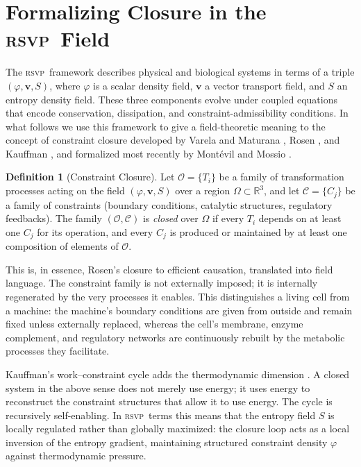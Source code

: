 \documentclass[11pt, a4paper]{article}
\theoremstyle{plain}
\theoremstyle{definition}
\newtheorem{definition}[theorem]{Definition}
\theoremstyle{remark}
\newcommand{\vv}{\mathbf{v}}
\newcommand{\Ent}{S}
\newcommand{\RSVP}{\textsc{rsvp}}
\begin{document}
\section{Formalizing Closure in the \RSVP\ Field}

The \RSVP\ framework describes physical and biological systems in terms of a triple $(\varphi, \vv, \Ent)$, where $\varphi$ is a scalar density field, $\vv$ a vector transport field, and $\Ent$ an entropy density field. These three components evolve under coupled equations that encode conservation, dissipation, and constraint-admissibility conditions. In what follows we use this framework to give a field-theoretic meaning to the concept of constraint closure developed by Varela and Maturana \cite{maturana1980, varela1979}, Rosen \cite{rosen1991}, and Kauffman \cite{kauffman2000}, and formalized most recently by Montévil and Mossio \cite{montevil2015}.

\begin{definition}[Constraint Closure]
Let $\mathcal{O} = \{T_i\}$ be a family of transformation processes acting on the field $(\varphi, \vv, \Ent)$ over a region $\Omega \subset \mathbb{R}^3$, and let $\mathcal{C} = \{C_j\}$ be a family of constraints (boundary conditions, catalytic structures, regulatory feedbacks). The family $(\mathcal{O}, \mathcal{C})$ is \emph{closed} over $\Omega$ if every $T_i$ depends on at least one $C_j$ for its operation, and every $C_j$ is produced or maintained by at least one composition of elements of $\mathcal{O}$.
\end{definition}

This is, in essence, Rosen's closure to efficient causation, translated into field language. The constraint family is not externally imposed; it is internally regenerated by the very processes it enables. This distinguishes a living cell from a machine: the machine's boundary conditions are given from outside and remain fixed unless externally replaced, whereas the cell's membrane, enzyme complement, and regulatory networks are continuously rebuilt by the metabolic processes they facilitate.

Kauffman's work--constraint cycle adds the thermodynamic dimension \cite{kauffman1993}. A closed system in the above sense does not merely use energy; it uses energy to reconstruct the constraint structures that allow it to use energy. The cycle is recursively self-enabling. In \RSVP\ terms this means that the entropy field $\Ent$ is locally regulated rather than globally maximized: the closure loop acts as a local inversion of the entropy gradient, maintaining structured constraint density $\varphi$ against thermodynamic pressure.
\end{document}
